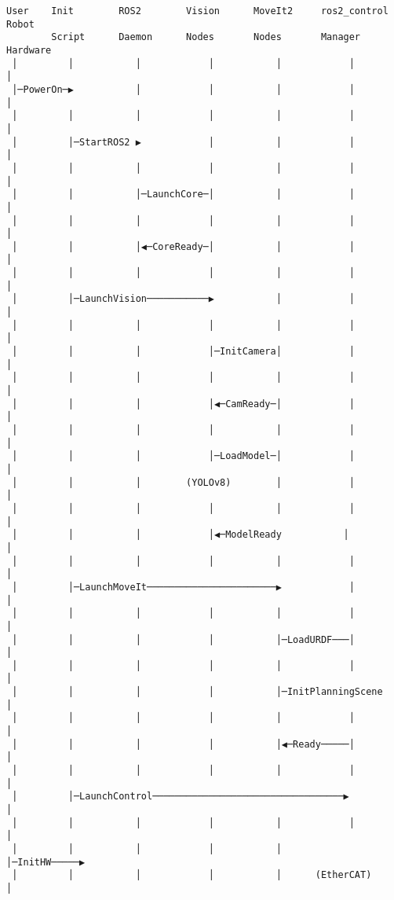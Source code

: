 \documentclass[
]{article}
\begin{document}
\begin{verbatim}
User    Init        ROS2        Vision      MoveIt2     ros2_control  Robot
        Script      Daemon      Nodes       Nodes       Manager       Hardware
 │         │           │            │           │            │            │
 │─PowerOn─▶           │            │           │            │            │
 │         │           │            │           │            │            │
 │         │─StartROS2 ▶            │           │            │            │
 │         │           │            │           │            │            │
 │         │           │─LaunchCore─│           │            │            │
 │         │           │            │           │            │            │
 │         │           │◀─CoreReady─│           │            │            │
 │         │           │            │           │            │            │
 │         │─LaunchVision───────────▶           │            │            │
 │         │           │            │           │            │            │
 │         │           │            │─InitCamera│            │            │
 │         │           │            │           │            │            │
 │         │           │            │◀─CamReady─│            │            │
 │         │           │            │           │            │            │
 │         │           │            │─LoadModel─│            │            │
 │         │           │        (YOLOv8)        │            │            │
 │         │           │            │           │            │            │
 │         │           │            │◀─ModelReady           │            │
 │         │           │            │           │            │            │
 │         │─LaunchMoveIt───────────────────────▶            │            │
 │         │           │            │           │            │            │
 │         │           │            │           │─LoadURDF───│            │
 │         │           │            │           │            │            │
 │         │           │            │           │─InitPlanningScene       │
 │         │           │            │           │            │            │
 │         │           │            │           │◀─Ready─────│            │
 │         │           │            │           │            │            │
 │         │─LaunchControl──────────────────────────────────▶            │
 │         │           │            │           │            │            │
 │         │           │            │           │            │─InitHW─────▶
 │         │           │            │           │      (EtherCAT)         │

\end{verbatim}
\end{document}
